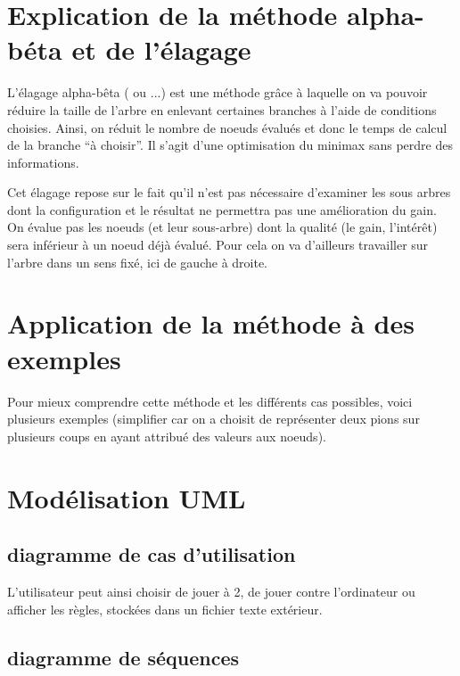 \documentclass[12,french]{report}
\begin{document}
\section{Explication de la méthode alpha-béta et de l'élagage}

L'élagage alpha-bêta ( ou ...) est une méthode grâce à laquelle on
va pouvoir réduire la taille de l'arbre en enlevant certaines branches
à l'aide de conditions choisies. Ainsi, on réduit le nombre de noeuds
évalués et donc le temps de calcul de la branche ``à choisir''.
Il s'agit d'une optimisation du minimax sans perdre des informations. 

Cet élagage repose sur le fait qu'il n'est pas nécessaire d'examiner
les sous arbres dont la configuration et le résultat ne permettra
pas une amélioration du gain. On évalue pas les noeuds (et leur sous-arbre)
dont la qualité (le gain, l'intérêt) sera inférieur à un noeud déjà
évalué. Pour cela on va d'ailleurs travailler sur l'arbre dans un
sens fixé, ici de gauche à droite. 

\section{Application de la méthode à des exemples}

Pour mieux comprendre cette méthode et les différents cas possibles,
voici plusieurs exemples (simplifier car on a choisit de représenter
deux pions sur plusieurs coups en ayant attribué des valeurs aux noeuds).

\section{Modélisation UML}

\subsection{diagramme de cas d'utilisation}

%
\begin{figure}
\centering{}
\end{figure}

L'utilisateur peut ainsi choisir de jouer à 2, de jouer contre l'ordinateur
ou afficher les règles, stockées dans un fichier texte extérieur.

\subsection{diagramme de séquences}
\end{document}

